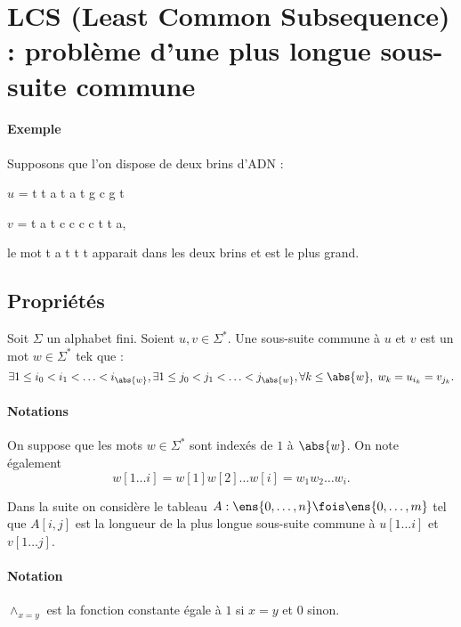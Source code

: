 \documentclass{mybourbaki}
\begin{document}
\section{LCS (Least Common Subsequence) : problème d'une plus longue sous-suite commune}

\paragraph{Exemple}Supposons que l'on dispose de deux brins d'ADN : 
\begin{center}
$u$ = t t a t a t g c g t

$v$ = t a t c c c c t t a,
\end{center}
le mot \og t a t t t \fg{} apparait dans les deux brins et est le plus grand.

\subsection{Propriétés}

Soit $\Sigma$ un alphabet fini. 
Soient $u,v\in \Sigma^{*}$. Une sous-suite commune à $u$ et $v$ est un mot $w\in \Sigma^{*}$ tek que : \[ \exists 1\leq i_0 < i_1< \ldots < i_{\abs{w}}, \exists 1 \leq j_0 < j_1 < \ldots < j_{\abs{w}}, \forall k \leq \abs{w}, \; w_{k} = u_{i_k}=v_{j_k}.\]

\paragraph{Notations}On suppose que les mots $w\in \Sigma^{*}$ sont indexés de $1$ à $\abs{w}$. On note également \[ w[1\ldots i] = w[1]w[2]\ldots w[i] = w_1w_2\ldots w_i.\]

Dans la suite on considère le tableau $A : \ens{0,\ldots,n}\fois \ens{0,\ldots,m}$ tel que $A[i,j]$ est la longueur de la plus longue sous-suite commune à $u[1\ldots i]$ et $v[1\ldots j]$.


\paragraph{Notation}$\wedge_{x=y}$ est la fonction constante égale à $1$ si $x=y$ et $0$ sinon.
\end{document}
